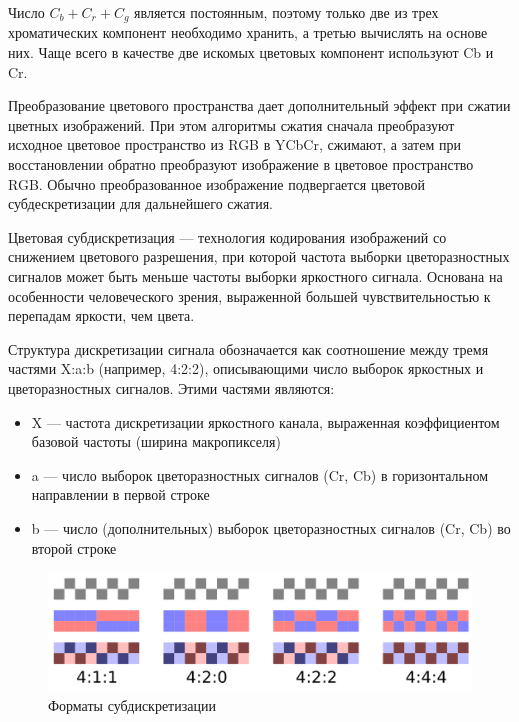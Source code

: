 Число $C_b+C_r+C_g$ является постоянным, поэтому только две из трех хроматических компонент необходимо хранить, а третью вычислять на основе них. Чаще всего в качестве две искомых цветовых компонент используют Cb и Cr. 

Преобразование цветового пространства дает дополнительный эффект при сжатии цветных изображений. При этом алгоритмы сжатия сначала преобразуют исходное цветовое пространство из RGB в YCbCr, сжимают, а затем при восстановлении обратно преобразуют изображение в цветовое пространство RGB. Обычно преобразованное изображение подвергается цветовой субдескретизации для дальнейшего сжатия.

Цветовая субдискретизация — технология кодирования изображений со снижением цветового разрешения, при которой частота выборки цветоразностных сигналов может быть меньше частоты выборки яркостного сигнала. Основана на особенности человеческого зрения, выраженной большей чувствительностью к перепадам яркости, чем цвета. 

Структура дискретизации сигнала обозначается как соотношение между тремя частями X:a:b (например, 4:2:2), описывающими число выборок яркостных и цветоразностных сигналов. Этими частями являются:

\begin{itemize}
	
	\item X — частота дискретизации яркостного канала, выраженная коэффициентом базовой частоты (ширина макропикселя)
	
	\item a — число выборок цветоразностных сигналов (Cr, Cb) в горизонтальном направлении в первой строке
	
	\item b — число (дополнительных) выборок цветоразностных сигналов (Cr, Cb) во второй строке
	
\end{itemize}


\begin{figure}[H]
	\begin{center}
		\includegraphics[scale=0.35]{pics/chroma_subsampling/chroma_subsampling_ratios.png}
		\caption{Форматы субдискретизации} 
		\label{pic:chroma_subsampling}
	\end{center}
\end{figure}

